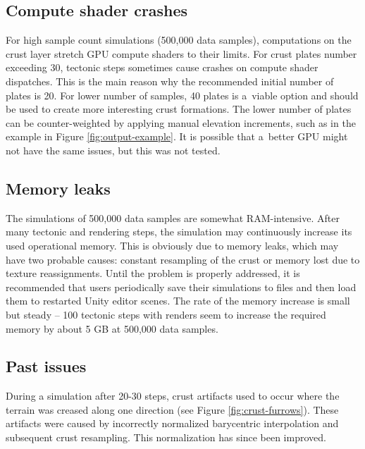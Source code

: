 \subsection{Compute shader crashes}
For high sample count simulations (500,000 data samples), computations on the crust layer stretch GPU compute shaders to their limits. For crust plates number exceeding 30, tectonic steps sometimes cause crashes on compute shader dispatches. This is the main reason why the recommended initial number of plates is 20. For lower number of samples, 40 plates is a~viable option and should be used to create more interesting crust formations. The lower number of plates can be counter-weighted by applying manual elevation increments, such as in the example in Figure  \ref{fig:output-example}. It is possible that a~better GPU might not have the same issues, but this was not tested.
\subsection{Memory leaks}
The simulations of 500,000 data samples are somewhat RAM-intensive. After many tectonic and rendering steps, the simulation may continuously increase its used operational memory. This is obviously due to memory leaks, which may have two probable causes: constant resampling of the crust or memory lost due to texture reassignments. Until the problem is properly addressed, it is recommended that users periodically save their simulations to files and then load them to restarted Unity editor scenes. The rate of the memory increase is small but steady -- 100 tectonic steps with renders seem to increase the required memory by about 5 GB at 500,000 data samples.
\subsection{Past issues}
During a simulation after 20-30 steps, crust artifacts used to occur where the terrain was creased along one direction (see Figure \ref{fig:crust-furrows}). These artifacts were caused by incorrectly normalized barycentric interpolation and subsequent crust resampling. This normalization has since been improved.
